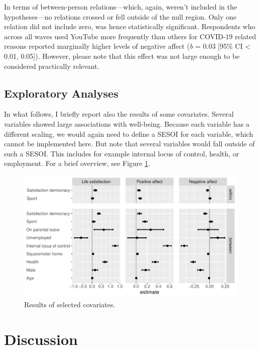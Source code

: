 \documentclass[
  english,
  man,mask,floatsintext]{apa6}
\begin{document}
In terms of between-person relations---which, again, weren't included in the hypotheses---no relations crossed or fell outside of the null region.
Only one relation did not include zero, was hence statistically significant.
Respondents who across all waves used YouTube more frequently than others for COVID-19 related reasons reported marginally higher levels of negative affect (\emph{b} = 0.03 {[}95\% CI \textless{} 0.01, 0.05{]}).
However, please note that this effect was not large enough to be considered practically relevant.

\hypertarget{exploratory-analyses}{%
\subsection{Exploratory Analyses}\label{exploratory-analyses}}

In what follows, I briefly report also the results of some covariates.
Several variables showed large associations with well-being.
Because each variable has a different scaling, we would again need to define a SESOI for each variable, which cannot be implemented here.
But note that several variables would fall outside of such a SESOI.
This includes for example internal locus of control, health, or employment.
For a brief overview, see Figure \ref{fig:res-control}.

\begin{figure}
\includegraphics[width=\textwidth]{figures/fig_results_control} \caption{Results of selected covariates.}\label{fig:res-control}
\end{figure}

\hypertarget{discussion}{%
\section{Discussion}\label{discussion}}
\end{document}
